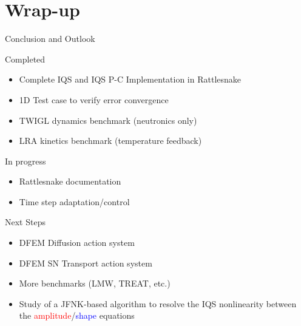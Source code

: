 \documentclass[8pt]{beamer}
\newcommand{\bi}{\begin{itemize}}
\newcommand{\ei}{\end{itemize}}
\newcommand{\tcr}[1]{\textcolor{red}{#1}}
\newcommand{\tcb}[1]{\textcolor{blue}{#1}}
\begin{document}
%
%


%


\section{Wrap-up}

\begin{frame}{Conclusion and Outlook}

\begin{block}{Completed}
\bi
\item Complete IQS and IQS P-C Implementation in Rattlesnake
\item 1D Test case to verify error convergence
\item TWIGL dynamics benchmark (neutronics only)
\item LRA kinetics benchmark (temperature feedback)
\ei
\end{block}

\begin{block}{In progress}
\bi
\item Rattlesnake documentation
\item Time step adaptation/control
\ei
\end{block}
\begin{block}{Next Steps}
\bi
\item DFEM Diffusion action system
\item DFEM SN Transport action system
\item More benchmarks (LMW, TREAT, etc.)
\item Study of a JFNK-based algorithm to resolve the IQS nonlinearity between the \tcr{amplitude}/\tcb{shape} equations
\ei
\end{block}

\end{frame}
\end{document}
